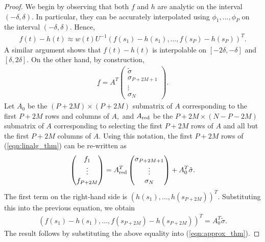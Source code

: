 \begin{proof}
We begin by observing that both $f$ and $h$ are analytic on the interval $(-\delta,\delta).$ In particular, they can be accurately interpolated using $\phi_1,\dots,\phi_P$ on the interval $(-\delta,\delta).$ Hence,
\begin{align}\label{eqn:approx_thm}
f(t)-h(t) \approx w(t) U^{-1} (f(s_1)-h(s_1),\dots,f(s_P)-h(s_P))^T.
\end{align}
A similar argument shows that $f(t)-h(t)$ is interpolable on $[-2\delta,-\delta]$ and $[\delta,2\delta].$
On the other hand, by construction,
\begin{align}\label{eqn:linalg_thm}
\underline{f} = A^T \begin{pmatrix}\tilde{\sigma}\\ \sigma_{P+{2M+1}}\\ \vdots\\ \sigma_N\end{pmatrix}.
\end{align}
Let $A_0$ be the $(P+2M)\times (P+2M)$ submatrix of $A$ corresponding to the first $P+2M$ rows and columns of $A,$ and $A_{\rm red}$ be the $P+2M \times (N-P-2M)$  submatrix of $A$ corresponding to selecting the first $P+2M$ rows of $A$ and all but the first $P+2M$ columns of $A.$ Using this notation, the first $P+2M$ rows of (\ref{eqn:linalg_thm}) can be re-written as
\begin{align}
\begin{pmatrix}f_1\\\vdots \\ f_{P+2M}\end{pmatrix}  = A_{\rm red}^T \begin{pmatrix} \sigma_{P+2M+1}\\ \vdots\\ \sigma_N\end{pmatrix} + A_0^T \tilde{\sigma}.
\end{align}
The first term on the right-hand side is $(h(s_1),\dots,h(s_{P+2M}))^T.$ Substituting this into the previous equation, we obtain
\begin{align}
(f(s_1)-h(s_1),\dots,f(s_{P+2M})-h(s_{P+2M}))^T = A_0^T \tilde{\sigma}.
\end{align}
The result follows by substituting the above equality into (\ref{eqn:approx_thm}).
\end{proof}

